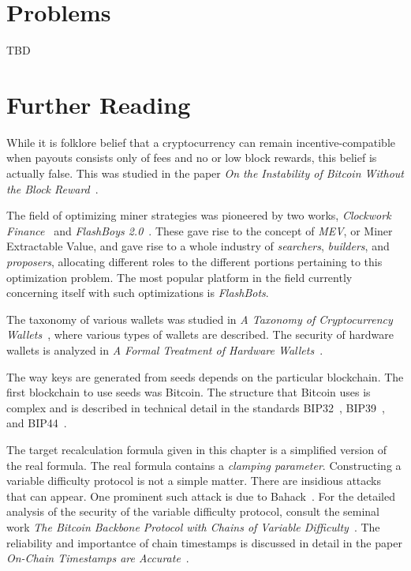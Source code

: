 \section*{Problems}
TBD

\section*{Further Reading}
While it is folklore belief that a cryptocurrency can remain incentive-compatible
when payouts consists only of fees and no or low block rewards, this belief is actually
false. This was studied in the paper
\emph{On the Instability of Bitcoin Without the Block Reward}~\cite{instability}.

The field of optimizing miner strategies was pioneered by two works,
\emph{Clockwork Finance}~\cite{clockwork} and \emph{FlashBoys 2.0}~\cite{flashboys}.
These gave rise to the concept of \emph{MEV}, or Miner Extractable Value, and
gave rise to a whole industry of \emph{searchers}, \emph{builders}, and \emph{proposers},
allocating different roles to the different portions pertaining to this optimization
problem. The most popular platform in the field currently concerning itself with
such optimizations is \emph{FlashBots}.

The taxonomy of various wallets was studied in
\emph{A Taxonomy of Cryptocurrency Wallets}~\cite{wallet-taxonomy}, where various
types of wallets are described. The security of hardware wallets is analyzed in
\emph{A Formal Treatment of Hardware Wallets}~\cite{hardware-wallets}.

The way keys are generated from seeds depends on the particular blockchain.
The first blockchain to use seeds was Bitcoin. The structure that Bitcoin
uses is complex and is described in technical detail in the standards
BIP32~\cite{bip32}, BIP39~\cite{bip39}, and BIP44~\cite{bip44}.


The target recalculation formula given in this chapter is a simplified
version of the real formula. The real formula contains a \emph{clamping
parameter}. Constructing a variable difficulty protocol is not a simple
matter. There are insidious attacks that can appear. One prominent such
attack is due to Bahack~\cite{bahack}. For the detailed analysis of the
security of the variable difficulty protocol, consult the seminal
work \emph{The Bitcoin Backbone Protocol with Chains of Variable
Difficulty}~\cite{varbackbone}. The reliability and importantce of chain
timestamps is discussed in detail in the paper \emph{On-Chain Timestamps
are Accurate}~\cite{timeliness}.
